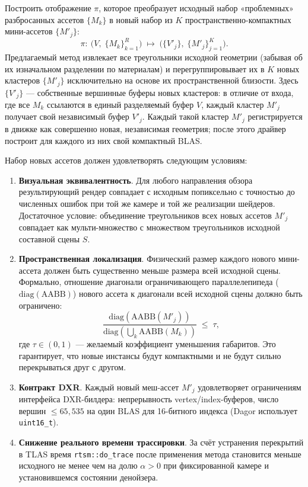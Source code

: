 Построить отображение $\pi$, которое преобразует исходный набор «проблемных» разбросанных ассетов $\{M_k\}$ в новый набор из $K$ пространственно-компактных мини-ассетов $\{M'_j\}$:
\begin{equation}
    \pi:\ \bigl(V,\; \{M_k\}_{k=1}^{R}\bigr) \;\longmapsto\; \bigl(\{V'_j\},\; \{M'_j\}_{j=1}^{K}\bigr).
\end{equation}
Предлагаемый метод извлекает все треугольники исходной геометрии (забывая об их изначальном разделении по материалам) и перегруппировывает их в $K$ новых кластеров $\{M'_j\}$ исключительно на основе их пространственной близости. Здесь $\{V'_j\}$ --- собственные вершинные буферы новых кластеров: в отличие от входа, где все $M_k$ ссылаются в единый разделяемый буфер $V$, каждый кластер $M'_j$ получает свой независимый буфер $V'_j$. Каждый такой кластер $M'_j$ регистрируется в движке как совершенно новая, независимая геометрия; после этого драйвер построит для каждого из них свой компактный BLAS.

Набор новых ассетов должен удовлетворять следующим условиям:
\begin{enumerate}
    \item \textbf{Визуальная эквивалентность}. Для любого направления
      обзора результирующий рендер совпадает с исходным попиксельно с точностью до численных ошибок при той
      же камере и той же реализации шейдеров. Достаточное условие:
      объединение треугольников всех новых ассетов $M'_j$ совпадает
      как мульти-множество с множеством треугольников исходной составной сцены $S$.
    \item \textbf{Пространственная локализация}. Физический размер каждого нового мини-ассета должен быть существенно меньше размера всей исходной сцены. Формально, отношение диагонали ограничивающего параллелепипеда ($\mathrm{diag}(\mathrm{AABB})$) нового ассета к диагонали всей исходной сцены должно быть ограничено:
      \[
          \dfrac{\mathrm{diag}(\mathrm{AABB}(M'_j))}{\mathrm{diag}\left(\bigcup_k \mathrm{AABB}(M_k)\right)} \;\le\; \tau,
      \]
      где $\tau \in (0, 1)$ --- желаемый коэффициент уменьшения габаритов. Это гарантирует, что новые инстансы будут компактными и не будут сильно перекрываться друг с другом.
    \item \textbf{Контракт DXR}. Каждый новый меш-ассет $M'_j$ удовлетворяет
      ограничениям интерфейса DXR-билдера: непрерывность
      vertex/index-буферов, число вершин $\le 65{,}535$ на один BLAS для
      16-битного индекса (Dagor использует
      \texttt{uint16\_t}).
    \item \textbf{Снижение реального времени трассировки}. За счёт устранения перекрытий в TLAS
      время \texttt{rtsm::do\_trace} после применения метода становится меньше исходного
      не менее чем на долю $\alpha > 0$ при фиксированной камере и
      установившемся состоянии денойзера.
\end{enumerate}

